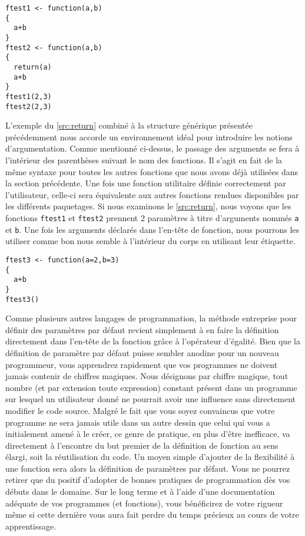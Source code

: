 \begin{lstlisting}[caption = L'instruction \texttt{return} et le retour standard d'une fonction R ,label=src:return]
ftest1 <- function(a,b)
{
  a+b
}
ftest2 <- function(a,b)
{
  return(a)
  a+b
}
ftest1(2,3)
ftest2(2,3)
\end{lstlisting}

\vspace{\baselineskip}
L'exemple du \autoref{src:return} combiné à la structure générique présentée précédemment nous accorde un environnement idéal pour introduire les notions d'argumentation. Comme mentionné ci-dessus, le passage des arguments se fera à l'intérieur des parenthèses suivant le nom des fonctions. Il s'agit en fait de la même syntaxe pour toutes les autres fonctions que nous avons déjà utilisées dans la section précédente. Une fois une fonction utilitaire définie correctement par l'utilisateur, celle-ci sera équivalente aux autres fonctions rendues disponibles par les différents paquetages. Si nous examinons le \autoref{src:return}, nous voyons que les fonctions \texttt{ftest1} et \texttt{ftest2} prennent 2 paramètres à titre d'arguments nommés \texttt{a} et \texttt{b}. Une fois les arguments déclarés dans l'en-tête de fonction, nous pourrons les utiliser comme bon nous semble à l'intérieur du corps en utilisant leur étiquette.

\begin{lstlisting}[caption = Définir des valeurs par défauts dans les fonctions utilitaires,label=src:defaultParams]
ftest3 <- function(a=2,b=3)
{
  a+b
}
ftest3()
\end{lstlisting}

\vspace{\baselineskip}
Comme plusieurs autres langages de programmation, la méthode entreprise pour définir des paramètres par défaut revient simplement à en faire la définition directement dans l'en-tête de la fonction grâce à l'opérateur d'égalité. Bien que la définition de paramètre par défaut puisse sembler anodine pour un nouveau programmeur, vous apprendrez rapidement que vos programmes ne doivent jamais contenir de chiffres magiques. Nous désignons par chiffre magique, tout nombre (et par extension toute expression) constant présent dans un programme sur lesquel un utilisateur donné ne pourrait avoir une influence sans directement modifier le code source. Malgré le fait que vous soyez convaincus que votre programme ne sera jamais utile dans un autre dessin que celui qui vous a initialement amené à le créer, ce genre de pratique, en plus d'être inefficace, va directement à l'encontre du but premier de la définition de fonction au sens élargi, soit la réutilisation du code. Un moyen simple d'ajouter de la flexibilité à une fonction sera alors la définition de paramètres par défaut. Vous ne pourrez retirer que du positif d'adopter de bonnes pratiques de programmation dès vos débuts dans le domaine. Sur le long terme et à l'aide d'une documentation adéquate de vos programmes (et fonctions), vous bénéficirez de votre rigueur même si cette dernière vous aura fait perdre du temps précieux au cours de votre apprentissage. \\

